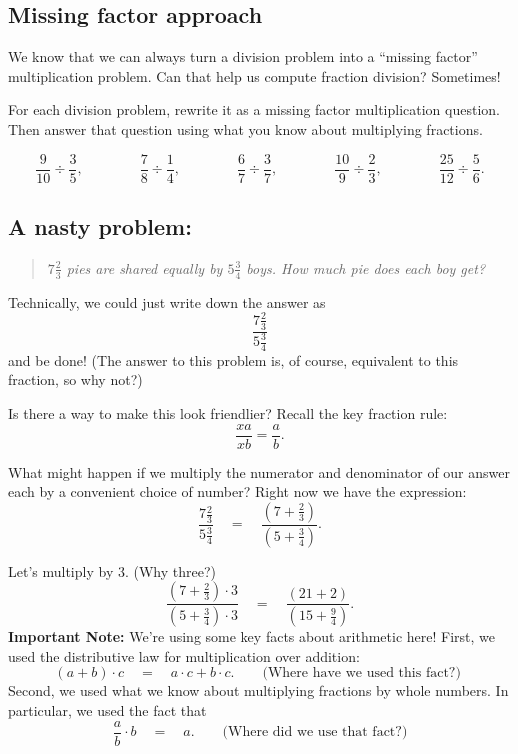 \subsection{Missing factor approach}
We know that we can always turn a division problem into a ``missing factor'' multiplication problem.  Can that help us compute fraction division?  Sometimes!

\begin{thinkpair*}
For each division problem, rewrite it as a missing factor multiplication question.  Then answer that  question using what you know about multiplying fractions.

\[
\frac{9}{10} \div \frac{3}{5},
\qquad\qquad
\frac 7 8  \div \frac 1 4,
\qquad\qquad
\frac 6 7  \div \frac 3 7,
\qquad\qquad
\frac{10}9 \div \frac 2 3,
\qquad\qquad
\frac{25}{12} \div \frac 5 6.
\]


\end{thinkpair*}


\subsection*{A nasty problem:}

\begin{quotation}
\emph{$7\frac 2 3$ 
pies are  shared equally by $5\frac 34$ boys.
 How much pie does each boy get?
} \end{quotation}


Technically, we could just write down the answer as
\[
\frac{7\frac 2 3}{5\frac 34}
\]
and be done! (The answer to this problem is, of course, equivalent to this fraction, so why not?) 

Is there a way to make this look
friendlier?
Recall the key fraction rule:
\[
\frac{xa}{xb} = \frac a b.
\]

What might happen if we multiply the numerator and denominator of our answer each by a convenient
choice of number? Right now we have the expression:
\[
\frac{7\frac 2 3}{5\frac 34}
\quad
=
\quad
\frac{\left(7+\frac 2 3\right)}{\left(5+ \frac 34\right)}.
\]

Let's multiply by 3. (Why three?)
\[
\frac{\left(7+\frac 2 3\right)\cdot 3}{\left(5+ \frac 34\right)\cdot 3}
\quad
=
\quad
\frac{\left(21+2\right)}{\left(15+ \frac 94\right)}.
\]
{\bf Important Note:} We're using some key facts about arithmetic here!  First, we used the distributive law for multiplication over addition: 
\[
(a+b)\cdot c 
\quad
= 
\quad
a\cdot c + b\cdot c. \qquad \text{(Where have we used this fact?) }
\]   Second, we used what we know about multiplying fractions by whole numbers.  In particular, we used the fact that 
\[
\frac a b \cdot b
\quad
 = 
 \quad
 a.\qquad  \text{(Where did we use that fact?)}
\]

